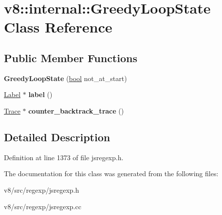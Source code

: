 \hypertarget{classv8_1_1internal_1_1GreedyLoopState}{}\section{v8\+:\+:internal\+:\+:Greedy\+Loop\+State Class Reference}
\label{classv8_1_1internal_1_1GreedyLoopState}
\subsection*{Public Member Functions}
\begin{DoxyCompactItemize}
\item 
\mbox{\label{classv8_1_1internal_1_1GreedyLoopState_ae1073242c409634af36abee3ffa76005}} 
{\bfseries Greedy\+Loop\+State} (\mbox{\hyperlink{classbool}{bool}} not\+\_\+at\+\_\+start)
\item 
\mbox{\label{classv8_1_1internal_1_1GreedyLoopState_aedb4d5d546a88b1fdc13472a13053d40}} 
\mbox{\hyperlink{classv8_1_1internal_1_1Label}{Label}} $\ast$ {\bfseries label} ()
\item 
\mbox{\label{classv8_1_1internal_1_1GreedyLoopState_a3ea9b79d50f954687dc2b2b862c55c2f}} 
\mbox{\hyperlink{classv8_1_1internal_1_1Trace}{Trace}} $\ast$ {\bfseries counter\+\_\+backtrack\+\_\+trace} ()
\end{DoxyCompactItemize}


\subsection{Detailed Description}


Definition at line 1373 of file jsregexp.\+h.



The documentation for this class was generated from the following files\+:\begin{DoxyCompactItemize}
\item 
v8/src/regexp/jsregexp.\+h\item 
v8/src/regexp/jsregexp.\+cc\end{DoxyCompactItemize}
